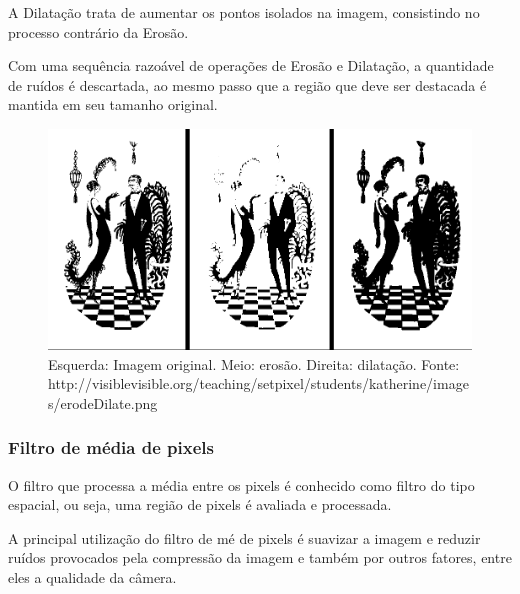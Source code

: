 \documentclass[12pt]{article}
\begin{document}
A Dilata\c c\~ao trata de aumentar os pontos isolados na imagem, consistindo no processo contr\'ario da Eros\~ao.

Com uma sequ\^encia razo\'avel de opera\c c\~oes de Eros\~ao e Dilata\c c\~ao, a quantidade de ru\'idos \'e descartada,
ao mesmo passo que a regi\~ao que deve ser destacada \'e mantida em seu tamanho original.

	\begin{figure}[ht!]
	\begin{center}
		\includegraphics[scale=0.3]{img/erodeDilate.png}
		\footnotesize \caption{Esquerda: Imagem original. Meio: eros\~ao. Direita: dilata\c c\~ao. Fonte: http://visiblevisible.org/teaching/setpixel/students/katherine/images/erodeDilate.png }
	\end{center}
	\end{figure}	

\subsubsection{Filtro de m\'edia de pixels}
O filtro que processa a m\'edia entre os pixels \'e conhecido como filtro do tipo espacial,
ou seja, uma regi\~ao de pixels \'e avaliada e processada.

A principal utiliza\c c\~ao do filtro de m\'e de pixels \'e suavizar a imagem e reduzir
ru\'idos provocados pela compress\~ao da imagem e tamb\'em por outros fatores, entre
eles a qualidade da c\^amera.
\end{document}
